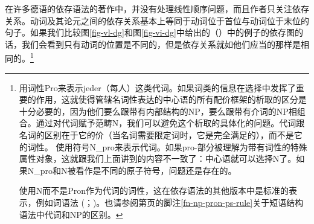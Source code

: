 在许多德语的依存语法的著作中，并没有处理线性顺序问题，而且作者只关注依存关系。动词及其论元之间的依存关系基本上等同于动词位于首位与动词位于末位的句子。如果我们比较图\ref{fig-vl-dg}和图\ref{fig-vi-dg}中给出的（）中的例子的依存图的话，我们会看到只有动词的位置是不同的，但是依存关系就如他们应当的那样是相同的。\footnote{%
 \citet{Eroms2000a}用词性Pro来表示jeder（每人）这类代词。如果词类的信息在选择中发挥了重要的作用，这就使得管辖名词性表达的中心语的所有配价框架的析取的区分是十分必要的，因为他们要么跟带有内部结构的NP，要么跟带有介词的NP相组合。通过对代词赋予范畴N，我们可以避免这个析取的具体化的问题。代词跟名词的区别在于它的价（当名词需要限定词时，它是完全满足的），而不是它的词性。 \citet[]{EH2003a}使用符号N\_pro来表示代词。如果pro-部分被理解为带有词性的特殊属性对象，这就跟我们上面讲到的内容不一致了：中心语就可以选择N了。如果N\_pro和N被看作是不同的原子符号，问题还是存在的。

使用N而不是Pron作为代词的词性，这在依存语法的其他版本中是标准的表示，例如词语法 (\citealp[]{Hudson90a-u}；\citealp[]{Hudson2007a-u})。也请参阅第\pageref{fn-np-pron-ps-rule}页的脚注\ref{fn-np-pron-ps-rule}关于短语结构语法中代词和NP的区别。
}
